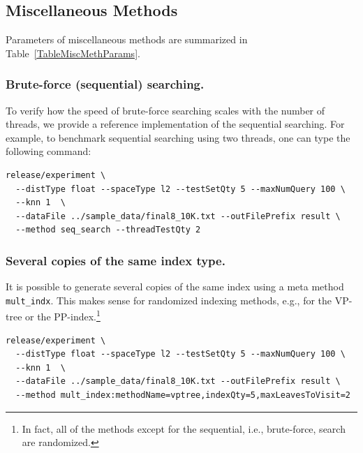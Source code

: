 \documentclass[runningheads,a4paper]{llncs}
\newcommand{\ttt}[1]{\texttt{#1}}
\begin{document}
\subsection{Miscellaneous Methods} \label{SectionMiscMeth}
Parameters of miscellaneous methods are summarized in Table~\ref{TableMiscMethParams}. 

\subsubsection{\textbf{Brute-force (sequential) searching}.}
To verify how the speed of brute-force searching
scales with the number of threads,
we provide a reference implementation of the sequential
searching.
For example, to benchmark sequential searching using two threads, 
one can type the following command:
{
\footnotesize
\begin{verbatim}
release/experiment \
  --distType float --spaceType l2 --testSetQty 5 --maxNumQuery 100 \
  --knn 1  \
  --dataFile ../sample_data/final8_10K.txt --outFilePrefix result \
  --method seq_search --threadTestQty 2
\end{verbatim}
}

\subsubsection{\textbf{Several copies of the same index type}.}
It is possible to generate several copies of the same index using a
meta method \ttt{mult\_indx}.
This makes sense for randomized indexing methods, e.g., for the VP-tree
or the PP-index.\footnote{In fact, all of the methods except for the sequential, i.e.,
brute-force, search are randomized.}

{
\footnotesize
\begin{verbatim}
release/experiment \
  --distType float --spaceType l2 --testSetQty 5 --maxNumQuery 100 \
  --knn 1  \
  --dataFile ../sample_data/final8_10K.txt --outFilePrefix result \
  --method mult_index:methodName=vptree,indexQty=5,maxLeavesToVisit=2
\end{verbatim}
}
\end{document}
